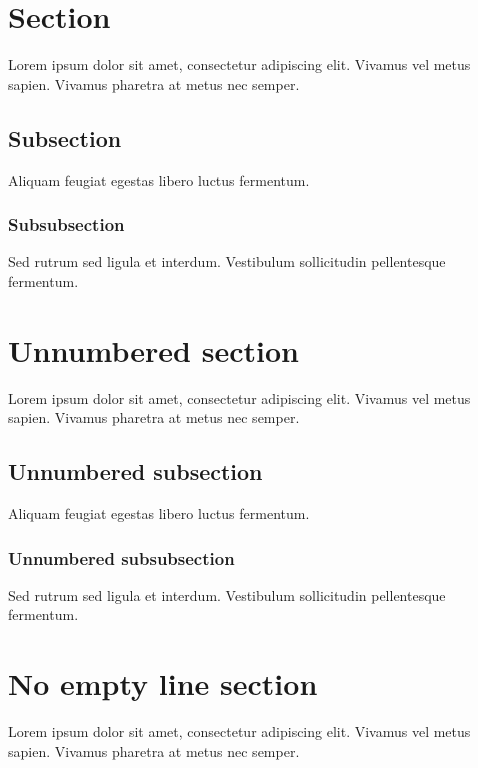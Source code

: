 \documentclass[10pt]{extarticle}
\date{}
\begin{document}

\section{Section}

Lorem ipsum dolor sit amet, consectetur adipiscing elit. Vivamus vel metus sapien. Vivamus pharetra at metus nec semper. 

\subsection{Subsection}

Aliquam feugiat egestas libero luctus fermentum. 

\subsubsection{Subsubsection}

Sed rutrum sed ligula et interdum. Vestibulum sollicitudin pellentesque fermentum. 

\section{Unnumbered section}

Lorem ipsum dolor sit amet, consectetur adipiscing elit. Vivamus vel metus sapien. Vivamus pharetra at metus nec semper. 

\subsection{Unnumbered subsection}

Aliquam feugiat egestas libero luctus fermentum. 

\subsubsection{Unnumbered subsubsection}

Sed rutrum sed ligula et interdum. Vestibulum sollicitudin pellentesque fermentum. 

\section{No empty line section}

Lorem ipsum dolor sit amet, consectetur adipiscing elit. Vivamus vel metus sapien. Vivamus pharetra at metus nec semper. 
\end{document}
